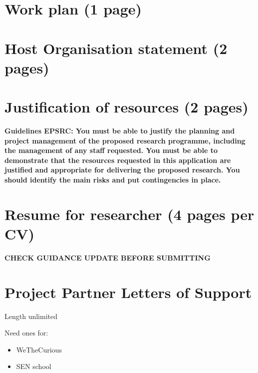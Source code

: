 \documentclass[11pt,a4paper]{report}
\newcommand{\TODO}[1]{{\color{red}\textbf{#1}}}
\newcommand{\epsrc}[1]{{\color{teal}\textbf{Guidelines EPSRC: #1}}}
\begin{document}
\pagebreak


\pagebreak
\chapter{Work plan (1 page)}
\pagebreak


\begin{landscape}
\begin{figure}[!ht]
\resizebox{\linewidth}{!}{
    
}
\end{figure}
\end{landscape}
\pagebreak


\chapter{Host Organisation statement (2 pages)}
\pagebreak

\chapter{Justification of resources (2 pages)}

\epsrc{You must be able to justify the planning and project management of the
proposed research programme, including the management of any staff requested.
You must be able to demonstrate that the resources requested in this application
are justified and appropriate for delivering the proposed research.  You should
identify the main risks and put contingencies in place.  }


\pagebreak

\pagebreak

\chapter{Resume for researcher (4 pages per CV)}

\TODO{CHECK GUIDANCE UPDATE BEFORE SUBMITTING}


\pagebreak


\pagebreak


\chapter{Project Partner Letters of Support}

Length unlimited

Need ones for:

\begin{itemize}
    \item WeTheCurious
    \item SEN school
\end{itemize}
\pagebreak
\end{document}
